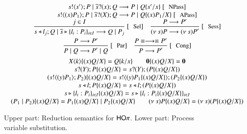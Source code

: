 \begin{figure}
\[
	\begin{array}{c}
		\begin{array}{c}
			\bout{s}{s'} P \Par \binp{\dual{s}}{x} Q \red P \Par Q \subst{s'}{x}\ \orule{NPass} \\
			\bout{s}{\abs{x}{P_1}} P \Par \binp{\dual{s}}{\X} Q \red P \Par Q \subst{\abs{x}{P_1}}{\X}\ \orule{APass}
			\\
			\tree{
				j \in I
			}{
				\bsel{s}{l_j} Q \Par \bbra{\dual{s}}{l_i : P_i}_{i \in I} \red Q \Par P_j 
			}\ \orule{Sel}
			\quad 
			\tree{
				P \red P'
			}{
				\news{s} P \red \news{s} P'
			}\ \orule{Sess}
			\\[4mm]
			\tree{
				P \red P'
			}{
				P \Par Q \red P' \Par Q
			}\ \orule{Par}
			\quad
			\tree{
				P \scong \red \scong P'
			}{
				P \red P'
			}\ \orule{Cong}
		\end{array}
		\vspace{2mm} \\
		\begin{array}{c}
			\appl{X}{k} \subst{\abs{x}{Q}}{\X} = Q \subst{k}{x}
			\qquad
			\inact \subst{\abs{x}{Q}}{\X} = \inact
			\\
			\binp{s}{\Y} P \subst{\abs{x}{Q}}{\X} = \binp{s}{\Y} (P \subst{\abs{x}{Q}}{\X})
			\\
			(\bout{s}{\abs{y}{P_1}} P_2) \subst{\abs{x}{Q}}{\X} = \bout{s}{\abs{y}{P_1 \subst{\abs{x}{Q}}{\X}}} (P_2 \subst{\abs{x}{Q}}{\X})
			\\
			\bsel{s}{l} P \subst{\abs{x}{Q}}{\X} = \bsel{s}{l} (P \subst{\abs{x}{Q}}{\X})
			\\
			\bbra{s}{l_i : P_i}_{i \in I} \subst{\abs{x}{Q}}{\X} = \bbra{s}{l_i : P_i \subst{\abs{x}{Q}}{\X}}_{i \in I}
			\\
			(P_1 \Par P_2) \subst{\abs{x}{Q}}{\X} = P_1 \subst{\abs{x}{Q}}{\X} \Par P_2 \subst{\abs{x}{Q}}{\X}
			\qquad
			\news{s} P \subst{\abs{x}{Q}}{\X} = \news{s} (P \subst{\abs{x}{Q}}{\X})
		\end{array}
	\end{array}
\]
	\caption{Upper part: Reduction semantics for $\mathsf{HO}\pi$. Lower part: Process variable substitution. \label{fig:reduction}}
\end{figure}
